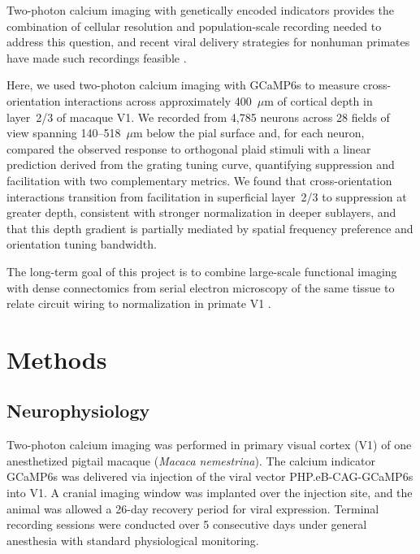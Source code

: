 \documentclass[11pt,letterpaper]{article}
\begin{document}
Two-photon calcium imaging with genetically encoded indicators
\citep{denk1990, stosiek2003, chen2013, grienberger2012} provides the
combination of cellular resolution and population-scale recording needed to
address this question, and recent viral delivery strategies for nonhuman
primates have made such recordings feasible \citep{deverman2016, li2017,
tang2018}.

Here, we used two-photon calcium imaging with GCaMP6s to measure
cross-orientation interactions across approximately 400~$\mu$m of cortical
depth in layer~2/3 of macaque V1. We recorded from 4,785 neurons across 28
fields of view spanning 140--518~$\mu$m below the pial surface and, for each
neuron, compared the observed response to orthogonal plaid stimuli with a
linear prediction derived from the grating tuning curve, quantifying
suppression and facilitation with two complementary metrics. We found that
cross-orientation interactions transition from facilitation in superficial
layer~2/3 to suppression at greater depth, consistent with stronger
normalization in deeper sublayers, and that this depth gradient is partially
mediated by spatial frequency preference and orientation tuning bandwidth.

The long-term goal of this project is to combine large-scale functional imaging
with dense connectomics from serial electron microscopy of the same tissue to
relate circuit wiring to normalization in primate V1
\citep{chatterjee2021}.

\section{Methods}

\subsection{Neurophysiology}

Two-photon calcium imaging was performed in primary visual cortex (V1) of one
anesthetized pigtail macaque (\textit{Macaca nemestrina}). The calcium
indicator GCaMP6s was delivered via injection of the viral vector
PHP.eB-CAG-GCaMP6s into V1. A cranial imaging window was implanted over the
injection site, and the animal was allowed a 26-day recovery period for viral
expression. Terminal recording sessions were conducted over 5 consecutive days
under general anesthesia with standard physiological monitoring.
\end{document}

